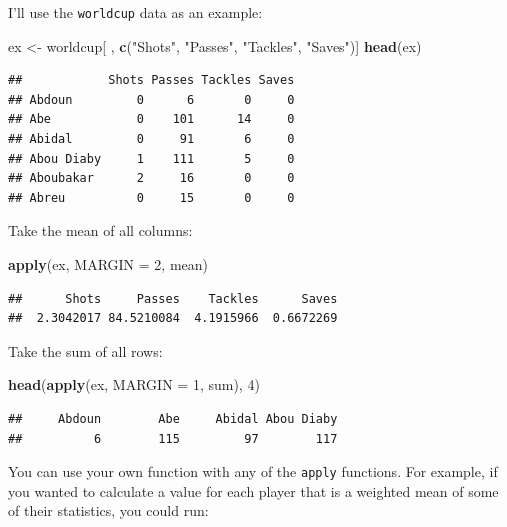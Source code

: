 \documentclass[]{book}
\makeatletter
\newenvironment{Shaded}{\begin{snugshade}}{\end{snugshade}}
\newcommand{\KeywordTok}[1]{\textcolor[rgb]{0.13,0.29,0.53}{\textbf{{#1}}}}
\newcommand{\DataTypeTok}[1]{\textcolor[rgb]{0.13,0.29,0.53}{{#1}}}
\newcommand{\DecValTok}[1]{\textcolor[rgb]{0.00,0.00,0.81}{{#1}}}
\newcommand{\StringTok}[1]{\textcolor[rgb]{0.31,0.60,0.02}{{#1}}}
\newcommand{\NormalTok}[1]{{#1}}
\newenvironment{kframe}{%
\medskip{}
\setlength{\fboxsep}{.8em}
 \def\at@end@of@kframe{}%
 \ifinner\ifhmode%
  \def\at@end@of@kframe{\end{minipage}}%
  \begin{minipage}{\columnwidth}%
 \fi\fi%
 \def\FrameCommand##1{\hskip\@totalleftmargin \hskip-\fboxsep
 \colorbox{shadecolor}{##1}\hskip-\fboxsep
     \hskip-\linewidth \hskip-\@totalleftmargin \hskip\columnwidth}%
 \MakeFramed {\advance\hsize-\width
   \@totalleftmargin\z@ \linewidth\hsize
   \@setminipage}}%
 {\par\unskip\endMakeFramed%
 \at@end@of@kframe}
\renewenvironment{Shaded}{\begin{kframe}}{\end{kframe}}
\makeatother
\begin{document}
I'll use the \texttt{worldcup} data as an example:

\begin{Shaded}
\begin{Highlighting}[]
\NormalTok{ex <-}\StringTok{ }\NormalTok{worldcup[ , }\KeywordTok{c}\NormalTok{(}\StringTok{"Shots"}\NormalTok{, }\StringTok{"Passes"}\NormalTok{, }\StringTok{"Tackles"}\NormalTok{, }\StringTok{"Saves"}\NormalTok{)]}
\KeywordTok{head}\NormalTok{(ex)}
\end{Highlighting}
\end{Shaded}

\begin{verbatim}
##            Shots Passes Tackles Saves
## Abdoun         0      6       0     0
## Abe            0    101      14     0
## Abidal         0     91       6     0
## Abou Diaby     1    111       5     0
## Aboubakar      2     16       0     0
## Abreu          0     15       0     0
\end{verbatim}

Take the mean of all columns:

\begin{Shaded}
\begin{Highlighting}[]
\KeywordTok{apply}\NormalTok{(ex, }\DataTypeTok{MARGIN =} \DecValTok{2}\NormalTok{, mean)}
\end{Highlighting}
\end{Shaded}

\begin{verbatim}
##      Shots     Passes    Tackles      Saves 
##  2.3042017 84.5210084  4.1915966  0.6672269
\end{verbatim}

Take the sum of all rows:

\begin{Shaded}
\begin{Highlighting}[]
\KeywordTok{head}\NormalTok{(}\KeywordTok{apply}\NormalTok{(ex, }\DataTypeTok{MARGIN =} \DecValTok{1}\NormalTok{, sum), }\DecValTok{4}\NormalTok{)}
\end{Highlighting}
\end{Shaded}

\begin{verbatim}
##     Abdoun        Abe     Abidal Abou Diaby 
##          6        115         97        117
\end{verbatim}

You can use your own function with any of the \texttt{apply} functions.
For example, if you wanted to calculate a value for each player that is
a weighted mean of some of their statistics, you could run:
\end{document}
